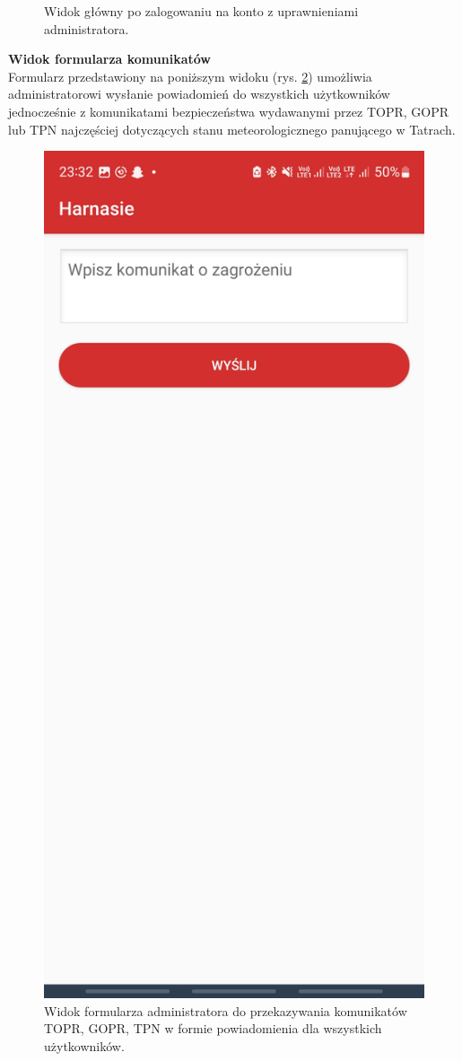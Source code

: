 \begin{figure}[H]
    \caption{Widok główny po zalogowaniu na konto z uprawnieniami administratora.}
    \label{widok:adminhome}
\end{figure}

\textbf{Widok formularza komunikatów}\\
Formularz przedstawiony na poniższym widoku (rys. \ref{widok:admindanger}) umożliwia administratorowi wysłanie powiadomień do wszystkich użytkowników jednocześnie z komunikatami bezpieczeństwa wydawanymi przez TOPR, GOPR lub TPN najczęściej dotyczących stanu meteorologicznego panującego w Tatrach.
\begin{figure}[H]
    \centering
    \includegraphics[scale=0.15]{img/imp/widok-admin-danger.jpg}
    \caption{Widok formularza administratora do przekazywania komunikatów TOPR, GOPR, TPN w formie powiadomienia dla wszystkich użytkowników.}
    \label{widok:admindanger}
\end{figure}

